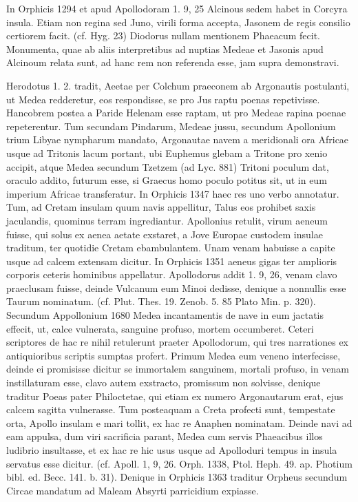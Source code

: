 \documentclass[landscape, a4paper, 11pt, oneside, polutonikogreek, german]{article}
\begin{document}
In Orphicis 1294 et apud Apollodoram 1. 9, 25 Alcinous sedem habet in Corcyra insula. Etiam non regina sed Juno, virili forma accepta, Jasonem de regis consilio certiorem facit. (cf. Hyg. 23) Diodorus nullam mentionem Phaeacum fecit. Monumenta, quae ab aliis interpretibus ad nuptias Medeae et Jasonis apud Alcinoum relata sunt, ad hanc rem non referenda esse, jam supra demonstravi.

Herodotus 1. 2. tradit, Aeetae per Colchum praeconem ab Argonautis postulanti, ut Medea redderetur, eos respondisse, se pro Jus raptu poenas repetivisse. Hancobrem postea a Paride Helenam esse raptam, ut pro Medeae rapina poenae repeterentur. Tum secundam Pindarum, Medeae jussu, secundum Apollonium trium Libyae nympharum mandato, Argonautae navem a meridionali ora Africae usque ad Tritonis lacum portant, ubi Euphemus glebam a Tritone pro xenio accipit, atque Medea secundum Tzetzem (ad Lyc. 881) Tritoni poculum dat, oraculo addito, futurum esse, si Graecus homo poculo potitus sit, ut in eum imperium Africae transferatur. In Orphicis 1347 haec res uno verbo annotatur. Tum, ad Cretam insulam quum navis appellitur, Talus eos prohibet saxis jaculandis, quominus terram ingrediantur. Apollonius retulit, virum aeneum fuisse, qui solus ex aenea aetate exstaret, a Jove Europae custodem insulae traditum, ter quotidie Cretam ebambulantem. Unam venam habuisse a capite usque ad calcem extensam dicitur. In Orphicis 1351 aeneus gigas ter amplioris corporis ceteris hominibus appellatur. Apollodorus addit 1. 9, 26, venam clavo praeclusam fuisse, deinde Vulcanum eum Minoi dedisse, denique a nonnullis esse Taurum nominatum. (cf. Plut. Thes. 19. Zenob. 5. 85 Plato Min. p. 320). Secundum Appollonium 1680 Medea incantamentis de nave in eum jactatis effecit, ut, calce vulnerata, sanguine profuso, mortem occumberet. Ceteri scriptores de hac re nihil retulerunt praeter Apollodorum, qui tres narrationes ex antiquioribus scriptis sumptas profert. Primum Medea eum veneno interfecisse, deinde ei promisisse dicitur se immortalem sanguinem, mortali profuso, in venam instillaturam esse, clavo autem exstracto, promissum non solvisse, denique traditur Poeas pater Philoctetae, qui etiam ex numero Argonautarum erat, ejus calcem sagitta vulnerasse. Tum posteaquam a Creta profecti sunt, tempestate orta, Apollo insulam e mari tollit, ex hac re Anaphen nominatam. Deinde navi ad eam appulsa, dum viri sacrificia parant, Medea cum servis Phaeacibus illos ludibrio insultasse, et ex hac re hic usus usque ad Apolloduri tempus in insula servatus esse dicitur. (cf. Apoll. 1, 9, 26. Orph. 1338, Ptol. Heph. 49. ap. Photium bibl. ed. Becc. 141. b. 31). Denique in Orphicis 1363 traditur Orpheus secundum Circae mandatum ad Maleam Absyrti parricidium expiasse.
\end{document}
